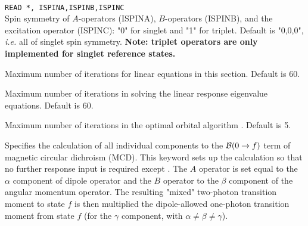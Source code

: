 \begin{description}
\item{}\\
\verb|READ *, ISPINA,ISPINB,ISPINC|\\
Spin symmetry of $A$-operators (ISPINA), $B$-operators (ISPINB),
and the excitation operator (ISPINC): "0" for singlet and "1" for triplet.
Default is "0,0,0", {\it i.e.\/} all of singlet spin symmetry.
{\bf Note: triplet operators are only implemented for singlet reference states.}

\item{}
Maximum number of iterations for linear equations in this section.
Default is 60.

\item{}
Maximum number of iterations in solving the linear
response eigenvalue
equations.
Default is 60.

\item{}
Maximum number of iterations in the optimal
orbital algorithm
\cite{tuhjahjajpjjcp84}.
Default is 5.

\item{}
Specifies the calculation of all individual components to the
${\cal{B}}(0\to f)$ term of magnetic circular dichroism
(MCD).
This keyword sets up the calculation so that no further response input is required except .
The $A$ operator is set equal to the $\alpha$ component of dipole
operator and
the $B$ operator to the $\beta$ component of the angular momentum
operator. The resulting "mixed" two-photon transition moment to state $f$
is then multiplied the dipole-allowed one-photon transition moment
from state $f$ (for the $\gamma$ component, with $\alpha \neq \beta \neq \gamma$).
\cite{Coriani:MCDRSP}


\end{description}
